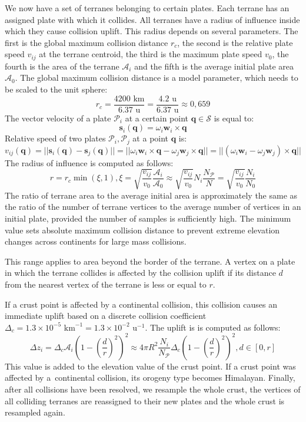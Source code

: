 We now have a set of terranes belonging to certain plates. Each terrane has an assigned plate with which it collides. All terranes have a radius of influence inside which they cause collision uplift. This radius depends on several parameters. The first is the global maximum collision distance $r_c$, the second is the relative plate speed $v_{ij}$ at the terrane centroid, the third is the maximum plate speed $v_0$, the fourth is the area of the terrane $\mathcal{A}_i$ and the fifth is the average initial plate area $\mathcal{A}_0$. The global maximum collision distance is a model parameter, which needs to be scaled to the unit sphere:
$$r_c=\frac{4200\mbox{ km}}{6.37\mbox{ u}}=\frac{4.2\mbox{ u}}{6.37\mbox{ u}}\approx 0,659$$
The vector velocity of a plate $\mathcal{P}_i$ at a certain point $\mathbf{q}\in\mathcal{S}$ is equal to:
$$\mathbf{s}_i(\mathbf{q})=\omega_i\mathbf{w}_i\times\mathbf{q}$$
Relative speed of two plates $\mathcal{P}_i,\mathcal{P}_j$ at a point $\mathbf{q}$ is:
$$v_{ij}(\mathbf{q})=||\mathbf{s}_i(\mathbf{q})-\mathbf{s}_j(\mathbf{q})||=||\omega_i\mathbf{w}_i\times\mathbf{q}-\omega_j\mathbf{w}_j\times\mathbf{q}||=||(\omega_i\mathbf{w}_i-\omega_j\mathbf{w}_j)\times\mathbf{q}||$$
The radius of influence is computed as follows:
$$r = r_c\min(\xi,1), \xi = \sqrt{\frac{v_{ij}}{v_0}}\frac{\mathcal{A}_i}{\mathcal{A}_0}\approx \sqrt{\frac{v_{ij}}{v_0}}N_i\frac{N_\mathcal{P}}{N}= \sqrt{\frac{v_{ij}}{v_0}}\frac{N_i}{N_0}$$
The ratio of terrane area to the average initial area is approximately the same as the ratio of the number of terrane vertices to the average number of vertices in an initial plate, provided the number of samples is sufficiently high. The minimum value sets absolute maximum collision distance to prevent extreme elevation changes across continents for large mass collisions.

This range applies to area beyond the border of the terrane. A vertex on a plate in which the terrane collides is affected by the collision uplift if its distance $d$ from the nearest vertex of the terrane is less or equal to $r$.

If  a crust point is affected by a continental collision, this collision causes an immediate uplift based on a discrete collision coefficient $\Delta_c=1.3\times10^{-5}\mbox{ km}^{-1}=1.3\times10^{-2}\mbox{ u}^{-1}$. The uplift is is computed as follows:
$$\Delta z_i=\Delta_c\mathcal{A}_i\left(1-\left(\frac{d}{r}\right)^2\right)^2\approx4\pi R^2\frac{N_i}{N_\mathcal{P}}\Delta_c\left(1-\left(\frac{d}{r}\right)^2\right)^2,d\in[0,r]$$
This value is added to the elevation value of the crust point. If a crust point was affected by a~continental collision, its orogeny type becomes Himalayan. Finally, after all collisions have been resolved, we resample the whole crust, the vertices of all colliding terranes are reassigned to their new plates and the whole crust is resampled again.

